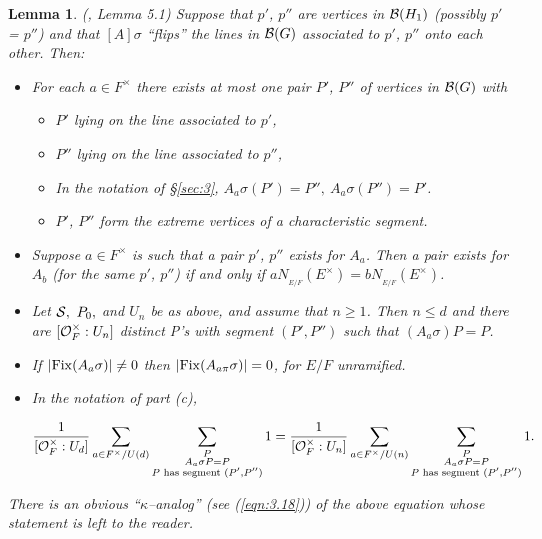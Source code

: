 \documentclass[12pt,letterpaper]{article}
\newtheorem{lemma}[theorem]{Lemma}
\def\off{{\cal O}_F}
\def\bbg{{\cal B}(G)}
\def\bbH1{{\cal B}(H_1)}
\begin{document}
\begin{lemma}
\label{lemma:4.16} 
(\cite{La1}, Lemma 5.1) 
Suppose that $p'$, $p''$ are 
vertices in
$\bbH1$ (possibly $p'$ = $p''$) and that $[A]\sigma$ ``flips'' the lines
in $\bbg$ associated to $p'$, $p''$ onto each other. Then:

\begin{itemize}
\item[(a)] 
For each $a\in F^{\times}$ there exists at most one pair $P'$, $P''$
of vertices in $\bbg$ with

\begin{itemize}
\item[(i)] 
$ P'$ lying on the line associated to $p'$,

\item[(ii)] 
$P''$ lying on the line associated to $p''$,

\item[(iii)]
In the notation of \S \ref{sec:3}, $A_a\sigma (P') = P'',
\ A_a\sigma (P'')=P'$.

\item[(iv)] 
$P'$, $P''$ form the extreme vertices of a characteristic
segment.
\end{itemize}

\item[(b)] 
Suppose $a\in F^{\times}$ is such that a pair $p'$, $p''$ exists for $A_a$.
Then a pair exists for $A_b$ (for the same $p'$, $p''$) if and only
if $aN_{_{E/F}}(E^{\times})=bN_{_{E/F}}(E^{\times})$.

\item[(c)] 
Let ${\cal S},\ P_0,$ and $U_n$ be as above, and assume that $n\geq 1$.
Then $n \leq d$ and there are $[\off^{\times}:U_n]$ distinct
P's with segment $(P',P'')$ such that $(A_a\sigma )P = P$.

\item[(d)] 
If $|{\rm Fix}(A_a\sigma )|\not= 0$ then $|{\rm Fix}(A_{a\pi}\sigma )|=0$,
for $E/F$ unramified.

\item[(e)] 
In the notation of part (c),

\[
{1\over{[\off^{\times}:U_d]}}\sum_{a\in F^{\times}/U(d)}
\sum_{\substack{ P\\A_a\sigma P = P\\P \text{ has segment }(P',P'')}}
1 
={1\over{[\off^{\times}:U_n]}}\sum_{a\in F^{\times}/U(n)}
\sum_{\substack{ P\\A_a\sigma P = P\\P \text{ has segment }(P',P'')}}
1 .
\]
\end{itemize}

There is an obvious ``$\kappa$--analog'' (see (\ref{eqn:3.18})) 
of the above equation 
whose statement is left to the reader.
\end{lemma}
\end{document}
